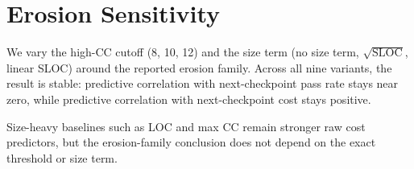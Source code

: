 \section{Erosion Sensitivity}\label{sec:erosion-sensitivity}

We vary the high-CC cutoff (8, 10, 12) and the size term (no size term, $\sqrt{\text{SLOC}}$, linear SLOC) around the reported erosion family. Across all nine variants, the result is stable: predictive correlation with next-checkpoint pass rate stays near zero, while predictive correlation with next-checkpoint cost stays positive.



Size-heavy baselines such as LOC and max CC remain stronger raw cost predictors, but the erosion-family conclusion does not depend on the exact threshold or size term.
